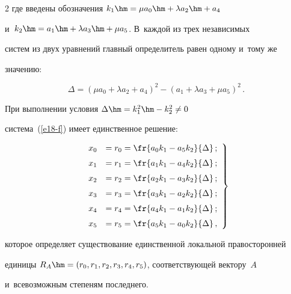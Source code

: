 \begin{multicols}{2}
где введены обозначения $k_1\hm= \mu a_0\hm+\lambda a_2\hm+a_4$ 


и~$k_2\hm= a_1\hm+\lambda a_3 \hm+\mu a_5$. В~каждой из трех независимых 


систем из двух уравнений главный определитель равен одному и~тому же 


значению: 


$$


\Delta =\left( \mu a_0+\lambda a_2+a_4\right)^2-\left( a_1+\lambda a_3+\mu 


a_5\right)^2\,.


$$


  


  При выполнении условия $\Delta\hm= k_1^2\hm- k_2^2\not= 0$ 


сис\-те\-ма~(\ref{e18-f}) имеет единственное решение:


\begin{equation}


\left.


\begin{array}{rl}


x_0&=r_0=\fr{a_0k_1-a_5k_2}{\Delta}\,;\\[6pt]


x_1&=r_1= \fr{a_1k_1-a_4k_2}{\Delta}\,;\\[6pt]


x_2&=r_2=\fr{a_2k_1-a_3k_2}{\Delta}\,;\\[6pt]


x_3&=r_3=\fr{a_3k_1-a_2k_2}{\Delta}\,;\\[6pt]


x_4&=r_4=\fr{a_4k_1-a_1k_2}{\Delta}\,;\\[6pt]


x_5&=r_5=\fr{a_5k_1-a_0k_2}{\Delta}\,,


\end{array}


\right\}


\label{e19-f}


\end{equation}


которое определяет существование единственной локальной правосторонней 


единицы $R_A\hm= (r_0, r_1, r_2, r_3, r_4, r_5)$, соответствующей вектору~$A$ 


и~всевозможным степеням последнего. 






\end{multicols}
